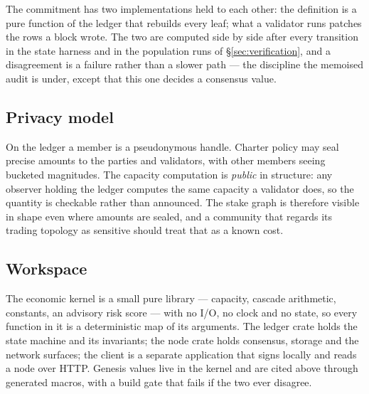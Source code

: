 The commitment has two implementations held to each other: the definition is a pure
function of the ledger that rebuilds every leaf; what a validator runs patches the rows a
block wrote. The two are computed side by side after every transition in the state
harness and in the population runs of \S\ref{sec:verification}, and a disagreement is a
failure rather than a slower path --- the discipline the memoised audit is under, except
that this one decides a consensus value.

\subsection{Privacy model}

On the ledger a member is a pseudonymous handle. Charter policy may seal precise amounts
to the parties and validators, with other members seeing bucketed magnitudes. The
capacity computation is \emph{public} in structure: any observer holding the ledger
computes the same capacity a validator does, so the quantity is checkable rather than
announced. The stake graph is therefore visible in shape even where amounts are sealed,
and a community that regards its trading topology as sensitive should treat that as a
known cost.

\subsection{Workspace}

The economic kernel is a small pure library --- capacity, cascade arithmetic, constants,
an advisory risk score --- with no I/O, no clock and no state, so every function in it is
a deterministic map of its arguments. The ledger crate holds the state machine and its
invariants; the node crate holds consensus, storage and the network surfaces; the client
is a separate application that signs locally and reads a node over HTTP. Genesis values
live in the kernel and are cited above through generated macros, with a build gate that
fails if the two ever disagree.
